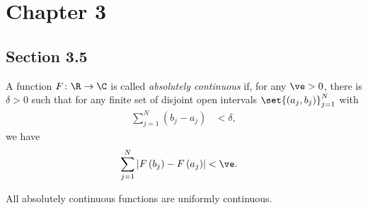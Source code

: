 \documentclass[10pt]{mypackage}
\begin{document}
\section{Chapter 3}%
\subsection{Section 3.5}%
\begin{definition}
  A function $F\colon \R\rightarrow \C$ is called \textit{absolutely continuous} if, for any $\ve > 0$, there is $\delta > 0$ such that for any finite set of disjoint open intervals $\set{\left( a_j,b_j \right)}_{j=1}^{N}$ with
  \begin{align*}
    \sum_{j=1}^{N} \left( b_j-a_j \right) &< \delta,
  \end{align*}
  we have
  \begin{align*}
    \sum_{j=1}^{N}\left\vert F\left( b_j \right) - F\left( a_j \right) \right\vert &< \ve.
  \end{align*}
\end{definition}
\begin{remark}
All absolutely continuous functions are uniformly continuous.
\end{remark}
\end{document}
